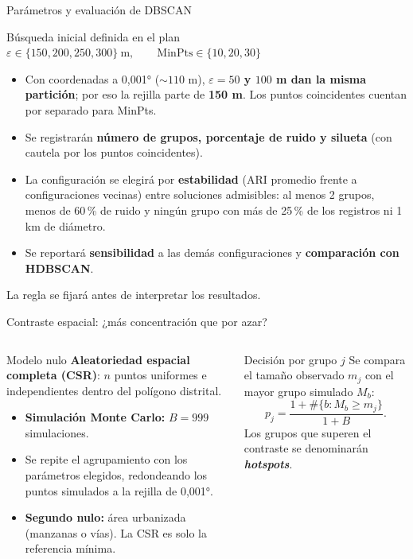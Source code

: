 \documentclass[aspectratio=169,10pt]{beamer}
\begin{document}
\begin{frame}{Parámetros y evaluación de DBSCAN}
  \begin{block}{Búsqueda inicial definida en el plan}
    \centering $\varepsilon \in \{150,200,250,300\}\ \text{m},\qquad \mathrm{MinPts}\in\{10,20,30\}$
  \end{block}
  \begin{itemize}
    \item Con coordenadas a 0,001° (${\sim}110$ m), \textbf{$\varepsilon=50$ y $100$ m dan la misma partición}; por eso la rejilla parte de \textbf{150 m}. Los puntos coincidentes cuentan por separado para MinPts.
    \item Se registrarán \textbf{número de grupos, porcentaje de ruido y silueta} (con cautela por los puntos coincidentes).
    \item La configuración se elegirá por \textbf{estabilidad} (ARI promedio frente a configuraciones vecinas) entre soluciones admisibles: al menos 2 grupos, menos de 60\,\% de ruido y ningún grupo con más de 25\,\% de los registros ni 1 km de diámetro.
    \item Se reportará \textbf{sensibilidad} a las demás configuraciones y \textbf{comparación con HDBSCAN}.
  \end{itemize}
  \vspace{.15cm}
  \footnotesize La regla se fijará antes de interpretar los resultados.
\end{frame}

\begin{frame}{Contraste espacial: ¿más concentración que por azar?}
  \begin{columns}[T,onlytextwidth]
      \begin{block}{Modelo nulo}
        \textbf{Aleatoriedad espacial completa (CSR)}: $n$ puntos uniformes e independientes dentro del polígono distrital.
        \begin{itemize}
          \item \textbf{Simulación Monte Carlo:} $B=999$ simulaciones.
          \item Se repite el agrupamiento con los parámetros elegidos, redondeando los puntos simulados a la rejilla de 0,001°.
          \item \textbf{Segundo nulo:} área urbanizada (manzanas o vías). La CSR es solo la referencia mínima.
        \end{itemize}
      \end{block}
      \begin{block}{Decisión por grupo $j$}
        Se compara el tamaño observado $m_j$ con el mayor grupo simulado $M_b$:
        \[
        p_j=\frac{1+\#\{b:M_b\geq m_j\}}{1+B}.
        \]
        Los grupos que superen el contraste se denominarán \textbf{\textit{hotspots}}.
      \end{block}
  \end{columns}
\end{frame}
\end{document}
